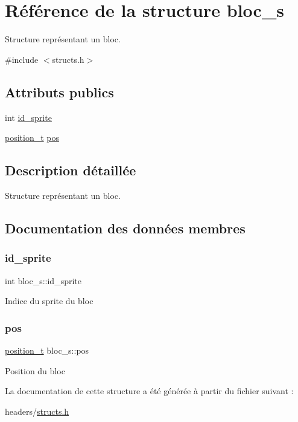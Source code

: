 \hypertarget{structbloc__s}{}\section{Référence de la structure bloc\+\_\+s}
\label{structbloc__s}


Structure représentant un bloc.  




{\ttfamily \#include $<$structs.\+h$>$}

\subsection*{Attributs publics}
\begin{DoxyCompactItemize}
\item 
int \hyperlink{structbloc__s_a291781698b4163cff50b321d5b010663}{id\+\_\+sprite}
\item 
\hyperlink{structposition__s}{position\+\_\+t} \hyperlink{structbloc__s_a66c2064caa2032e210387f8ffc8575de}{pos}
\end{DoxyCompactItemize}


\subsection{Description détaillée}
Structure représentant un bloc. 

\subsection{Documentation des données membres}
\mbox{\label{structbloc__s_a291781698b4163cff50b321d5b010663}} 
\subsubsection{\texorpdfstring{id\+\_\+sprite}{id\_sprite}}
{\footnotesize\ttfamily int bloc\+\_\+s\+::id\+\_\+sprite}

Indice du sprite du bloc \mbox{\label{structbloc__s_a66c2064caa2032e210387f8ffc8575de}} 
\subsubsection{\texorpdfstring{pos}{pos}}
{\footnotesize\ttfamily \hyperlink{structposition__s}{position\+\_\+t} bloc\+\_\+s\+::pos}

Position du bloc 

La documentation de cette structure a été générée à partir du fichier suivant \+:\begin{DoxyCompactItemize}
\item 
headers/\hyperlink{structs_8h}{structs.\+h}\end{DoxyCompactItemize}
